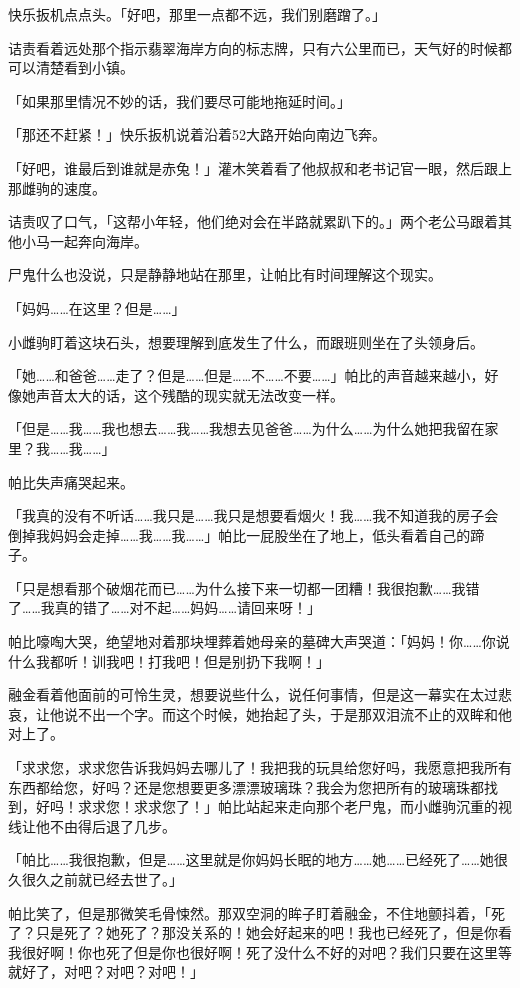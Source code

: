 快乐扳机点点头。「好吧，那里一点都不远，我们别磨蹭了。」

诘责看着远处那个指示翡翠海岸方向的标志牌，只有六公里而已，天气好的时候都可以清楚看到小镇。

「如果那里情况不妙的话，我们要尽可能地拖延时间。」

「那还不赶紧！」快乐扳机说着沿着52大路开始向南边飞奔。

「好吧，谁最后到谁就是赤兔！」灌木笑着看了他叔叔和老书记官一眼，然后跟上那雌驹的速度。

诘责叹了口气，「这帮小年轻，他们绝对会在半路就累趴下的。」两个老公马跟着其他小马一起奔向海岸。

\horizonline


尸鬼什么也没说，只是静静地站在那里，让帕比有时间理解这个现实。

「妈妈……在这里？但是……」

小雌驹盯着这块石头，想要理解到底发生了什么，而跟班则坐在了头领身后。

「她……和爸爸……走了？但是……但是……不……不要……」帕比的声音越来越小，好像她声音太大的话，这个残酷的现实就无法改变一样。

「但是……我……我也想去……我……我想去见爸爸……为什么……为什么她把我留在家里？我……我……」

帕比失声痛哭起来。

「我真的没有不听话……我只是……我只是想要看烟火！我……我不知道我的房子会倒掉我妈妈会走掉……我……我……」帕比一屁股坐在了地上，低头看着自己的蹄子。

「只是想看那个破烟花而已……为什么接下来一切都一团糟！我很抱歉……我错了……我真的错了……对不起……妈妈……请回来呀！」

帕比嚎啕大哭，绝望地对着那块埋葬着她母亲的墓碑大声哭道：「妈妈！你……你说什么我都听！训我吧！打我吧！但是别扔下我啊！」

融金看着他面前的可怜生灵，想要说些什么，说任何事情，但是这一幕实在太过悲哀，让他说不出一个字。而这个时候，她抬起了头，于是那双泪流不止的双眸和他对上了。

「求求您，求求您告诉我妈妈去哪儿了！我把我的玩具给您好吗，我愿意把我所有东西都给您，好吗？还是您想要更多漂漂玻璃珠？我会为您把所有的玻璃珠都找到，好吗！求求您！求求您了！」帕比站起来走向那个老尸鬼，而小雌驹沉重的视线让他不由得后退了几步。

「帕比……我很抱歉，但是……这里就是你妈妈长眠的地方……她……已经死了……她很久很久之前就已经去世了。」

帕比笑了，但是那微笑毛骨悚然。那双空洞的眸子盯着融金，不住地颤抖着，「死了？只是死了？她死了？那没关系的！她会好起来的吧！我也已经死了，但是你看我很好啊！你也死了但是你也很好啊！死了没什么不好的对吧？我们只要在这里等就好了，对吧？对吧？对吧！」

